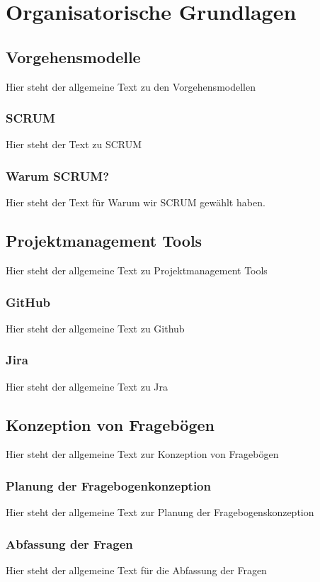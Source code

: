 \chapter{Organisatorische Grundlagen}
\label{cha:Diplomschrift}

\section{Vorgehensmodelle}
Hier steht der allgemeine Text zu den Vorgehensmodellen

\subsection{SCRUM}
Hier steht der Text zu SCRUM

\subsection{Warum SCRUM?}
Hier steht der Text für Warum wir SCRUM gewählt haben.

\section{Projektmanagement Tools}
Hier steht der allgemeine Text zu Projektmanagement Tools

\subsection{GitHub}
Hier steht der allgemeine Text zu Github

\subsection{Jira}
Hier steht der allgemeine Text zu Jra

\section{Konzeption von Fragebögen}
Hier steht der allgemeine Text zur Konzeption von Fragebögen

\subsection{Planung der Fragebogenkonzeption}
Hier steht der allgemeine Text zur Planung der Fragebogenskonzeption

\subsection{Abfassung der Fragen}
Hier steht der allgemeine Text für die Abfassung der Fragen

